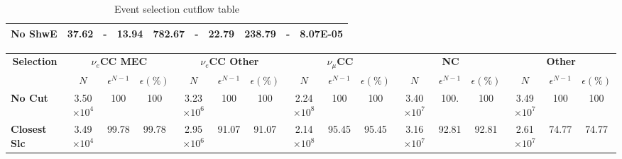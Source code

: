 \begin{table}[!hb]
\begin{tabular}{|l|ccc|ccc|ccc|}
\textbf{No ShwE}  & 37.62             & -                                                           & 13.94                                     & 782.67             & -                                                            & 22.79                                      & 238.79            & -                                                              & 8.07E-05   \\\hline
\end{tabular}
\caption{Event selection cutflow table}
\label{tab:CutflowTableSignal}
\end{table}

\begin{landscape}
\begin{table}[!hb]
\begin{tabular}{|l|ccc|ccc|ccc|ccc|ccc|}\hline
\multicolumn{1}{|c|}{\multirow{2}{*}{\textbf{Selection}}} & \multicolumn{3}{c|}{\textbf{$\nu_e$CC MEC}} &
\multicolumn{3}{c|}{\textbf{$\nu_e$CC Other}} &
\multicolumn{3}{c|}{\textbf{$\nu_\mu$CC}} &
\multicolumn{3}{c|}{\textbf{NC}} &
\multicolumn{3}{c|}{\textbf{Other}} \\
\multicolumn{1}{|c|}{}                                    & \multicolumn{1}{c}{\textbf{$N$}} & \textbf{$\epsilon^{N-1}$} & \textbf{$\epsilon \left(\%\right)$} & \multicolumn{1}{c}{\textbf{$N$}} & \textbf{$\epsilon^{N-1}$} & \textbf{$\epsilon \left(\%\right)$} & \multicolumn{1}{c}{\textbf{$N$}} & \textbf{$\epsilon^{N-1}$} & \textbf{$\epsilon \left(\%\right)$} & \multicolumn{1}{c}{\textbf{$N$}} & \textbf{$\epsilon^{N-1}$} & \textbf{$\epsilon \left(\%\right)$} & \multicolumn{1}{c}{\textbf{$N$}} & \textbf{$\epsilon^{N-1}$} & \textbf{$\epsilon \left(\%\right)$} \\\hline
\textbf{No Cut}      & 3.50$\times 10^4$           & 100 & 100                                     & 3.23$\times 10^6$             & 100 & 100 & 2.24$\times 10^8$              & 100                                                                 & 100                                        & 3.40$\times 10^7$          & 100.                                                             & 100                                    & 3.49$\times 10^7$                      & 100 & 100                                       \\
\textbf{Closest Slc} & 3.49$\times 10^4$          & 99.78                                                               & 99.78                                      & 2.95$\times 10^6$             & 91.07                                                                 & 91.07                                        & 2.14$\times 10^8$ & 95.45                                                                  & 95.45                                         & 3.16$\times 10^7$                   & 92.81                                                              & 92.81                                     & 2.61$\times 10^7$                      & 74.77                                                                 & 74.77                                        \\

\end{tabular}
\end{table}
\end{landscape}
